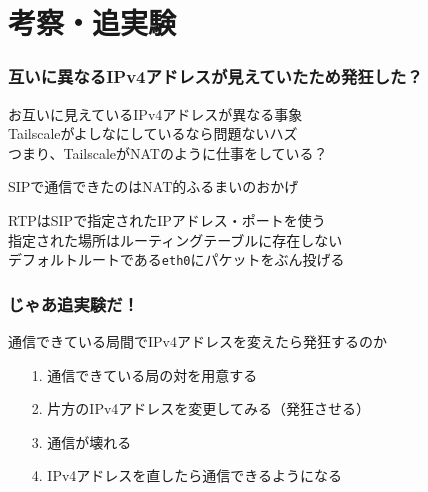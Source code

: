 \documentclass[
  lualatex,
  aspectratio=169,
  14pt
]{beamer}
\begin{document}
\section{考察・追実験}
\note{ }

\begin{frame}
  \frametitle{互いに異なるIPv4アドレスが見えていたため発狂した？}

  お互いに見えているIPv4アドレスが異なる事象\\
  \hspace{1.5\zw}Tailscaleがよしなにしているなら問題ないハズ\\
  \hspace{1.5\zw}つまり、TailscaleがNATのように仕事をしている？

  SIPで通信できたのはNAT的ふるまいのおかげ

  RTPはSIPで指定されたIPアドレス・ポートを使う\\
  \hspace{1.5\zw}指定された場所はルーティングテーブルに存在しない\\
  \hspace{1.5\zw}デフォルトルートである\texttt{eth0}にパケットをぶん投げる

  \note{ }
\end{frame}

\begin{frame}
  \frametitle{じゃあ追実験だ！}

  通信できている局間でIPv4アドレスを変えたら発狂するのか

  \begin{itemize}
    \item[1.]
      通信できている局の対を用意する
    \item[2.]
      片方のIPv4アドレスを変更してみる（発狂させる）
    \item[3.]
      通信が壊れる
    \item[4.]
      IPv4アドレスを直したら通信できるようになる
  \end{itemize}

  \note{ }
\end{frame}
\end{document}
